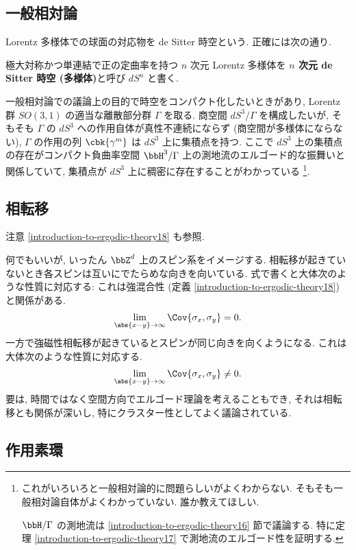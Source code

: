 \documentclass[openany, a4paper, oneside]{jsbook}
\begin{document}
\subsection{一般相対論}

Lorentz 多様体での球面の対応物を de Sitter 時空という.
正確には次の通り.
\begin{defn}[de Sitter 時空]
極大対称かつ単連結で正の定曲率を持つ $n$ 次元 Lorentz 多様体を
\textbf{$n$ 次元 de Sitter 時空 (多様体)}と呼び $dS^n$ と書く.
\end{defn}
一般相対論での議論上の目的で時空をコンパクト化したいときがあり,
Lorentz 群 $SO(3, 1)$ の適当な離散部分群 $\Gamma$ を取る.
商空間 $dS^3 / \Gamma$ を構成したいが,
そもそも $\Gamma$ の $dS^3$ への作用自体が真性不連続にならず (商空間が多様体にならない),
$\Gamma$ の作用の列 $\cbk{\gamma^m}$ は $dS^3$ 上に集積点を持つ.
ここで $dS^3$ 上の集積点の存在がコンパクト負曲率空間
$\bbH^3 / \Gamma$ 上の測地流のエルゴード的な振舞いと関係していて,
集積点が $dS^3$ 上に稠密に存在することがわかっている\cite{IshiabashiKoikeSiinoKojima1} \footnote{これがいろいろと一般相対論的に問題らしいがよくわからない.
そもそも一般相対論自体がよくわかっていない.
誰か教えてほしい.

$\bbH / \Gamma$ の測地流は \ref{introduction-to-ergodic-theory16} 節で議論する.
特に定理 \ref{introduction-to-ergodic-theory17} で測地流のエルゴード性を証明する.}.
\subsection{相転移}

注意 \ref{introduction-to-ergodic-theory18} も参照.

何でもいいが, いったん $\bbZ^d$ 上のスピン系をイメージする.
相転移が起きていないとき各スピンは互いにでたらめな向きを向いている.
式で書くと大体次のような性質に対応する: これは強混合性 (定義 \ref{introduction-to-ergodic-theory18}) と関係がある.
\begin{align}
 \lim_{\abs{x - y} \to \infty}\Cov{\sigma_x, \sigma_y}
 = 0.
\end{align}
一方で強磁性相転移が起きているとスピンが同じ向きを向くようになる.
これは大体次のような性質に対応する.
\begin{align}
 \lim_{\abs{x - y} \to \infty}\Cov{\sigma_x, \sigma_y}
 \neq 0.
\end{align}
要は, 時間ではなく空間方向でエルゴード理論を考えることもでき,
それは相転移とも関係が深いし, 特にクラスター性としてよく議論されている.
\subsection{作用素環}
\end{document}
